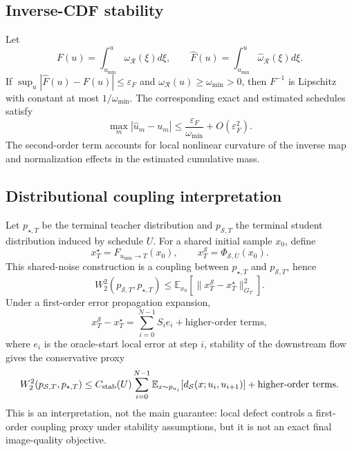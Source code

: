 \subsection{Inverse-CDF stability}
\label{app:inverse-stability-proof}

Let
\begin{equation}
  F(u)=\int_{u_{\min}}^u\omega_{\mathcal R}(\xi)d\xi,
  \qquad
  \widehat F(u)=\int_{u_{\min}}^u\widehat\omega_{\mathcal R}(\xi)d\xi.
\end{equation}
If $\sup_u|\widehat F(u)-F(u)|\le\varepsilon_F$ and
$\omega_{\mathcal R}(u)\ge\omega_{\min}>0$, then $F^{-1}$ is Lipschitz with
constant at most $1/\omega_{\min}$. The corresponding exact and estimated
schedules satisfy
\begin{equation}
  \max_m|\widehat u_m-u_m|
  \le
  \frac{\varepsilon_F}{\omega_{\min}}+O(\varepsilon_F^2).
\end{equation}
The second-order term accounts for local nonlinear curvature of the inverse
map and normalization effects in the estimated cumulative mass.

\subsection{Distributional coupling interpretation}
\label{app:w2-coupling}

Let $p_{\star,T}$ be the terminal teacher distribution and
$p_{\mathcal S,T}$ the terminal student distribution induced by schedule $U$.
For a shared initial sample $x_0$, define
\begin{equation}
  x_T^\star=F_{u_{\min}\rightarrow T}(x_0),
  \qquad
  x_T^{\mathcal S}=\Phi_{\mathcal S,U}(x_0).
\end{equation}
This shared-noise construction is a coupling between $p_{\star,T}$ and
$p_{\mathcal S,T}$, hence
\begin{equation}
  W_2^2(p_{\mathcal S,T},p_{\star,T})
  \le
  \mathbb E_{x_0}\!\left[\|x_T^{\mathcal S}-x_T^\star\|_{G_T}^2\right].
\end{equation}
Under a first-order error propagation expansion,
\begin{equation}
  x_T^{\mathcal S}-x_T^\star
  =
  \sum_{i=0}^{N-1}S_ie_i+\text{higher-order terms},
\end{equation}
where $e_i$ is the oracle-start local error at step $i$, stability of the
downstream flow gives the conservative proxy
\begin{equation}
  W_2^2(p_{\mathcal S,T},p_{\star,T})
  \le
  C_{\rm stab}(U)
  \sum_{i=0}^{N-1}
  \mathbb E_{x\sim p_{u_i}}
  [d_{\mathcal S}(x;u_i,u_{i+1})]
  +\text{higher-order terms}.
\end{equation}
This is an interpretation, not the main guarantee: local defect controls a
first-order coupling proxy under stability assumptions, but it is not an exact
final image-quality objective.
